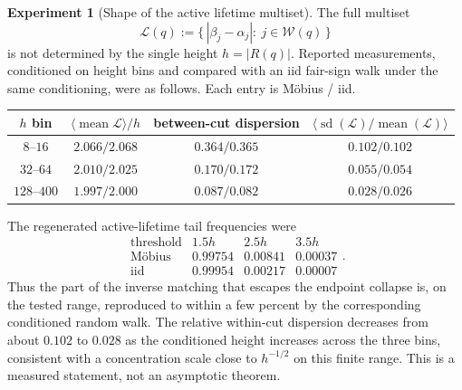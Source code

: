 \documentclass[11pt]{amsart}
\numberwithin{equation}{section}
\theoremstyle{plain}
\theoremstyle{definition}
\newtheorem{experiment}[theorem]{Experiment}
\theoremstyle{remark}
\begin{document}
\begin{experiment}[Shape of the active lifetime multiset]
\label{exp:active-lifetime-shape}
The full multiset
\begin{equation}
\label{eq:active-lifetime-multiset}
\mathcal L(q):=
\bigl\{\,|\beta_j-\alpha_j|:\ j\in\mathcal W(q)\,\bigr\}
\end{equation}
is not determined by the single height $h=|R(q)|$.  Reported measurements,
conditioned on height bins and compared with an iid fair-sign walk under the same
conditioning, were as follows.  Each entry is M\"obius / iid.
\begin{center}
\begin{tabular}{@{}cccc@{}}
\toprule
$h$ bin
& $\langle\operatorname{mean}\mathcal L\rangle/h$
& between-cut dispersion
& $\langle\operatorname{sd}(\mathcal L)/\operatorname{mean}(\mathcal L)\rangle$\\
\midrule
$8$--$16$   & $2.066/2.068$ & $0.364/0.365$ & $0.102/0.102$\\
$32$--$64$  & $2.010/2.025$ & $0.170/0.172$ & $0.055/0.054$\\
$128$--$400$& $1.997/2.000$ & $0.087/0.082$ & $0.028/0.026$\\
\bottomrule
\end{tabular}
\end{center}
The regenerated active-lifetime tail frequencies were
\begin{equation}
\label{eq:active-lifetime-tail-measured}
\begin{array}{c|ccc}
\text{threshold}&1.5h&2.5h&3.5h\\ \hline
\text{M\"obius}&0.99754&0.00841&0.00037\\
\text{iid}&0.99954&0.00217&0.00007
\end{array}.
\end{equation}
Thus the part of the inverse matching that escapes the endpoint collapse is,
on the tested range, reproduced to within a few percent by the corresponding
conditioned random walk.  The relative within-cut dispersion decreases from
about $0.102$ to $0.028$ as the conditioned height increases across the three
bins, consistent with a concentration scale close to $h^{-1/2}$ on this finite
range.
This is a measured statement, not an asymptotic theorem.
\end{experiment}
\end{document}
